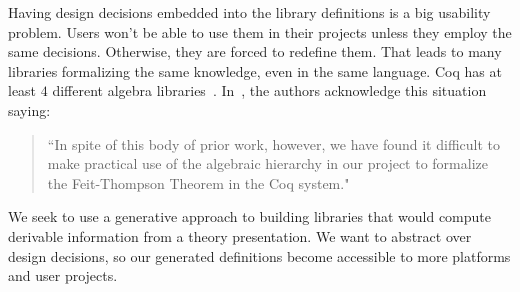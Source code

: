 Having design decisions embedded into the library definitions is a big usability problem. Users won't be able to use them in their projects unless they employ the same decisions. Otherwise, they are forced to redefine them. That leads to many libraries formalizing the same knowledge, even in the same language. Coq has at least $4$ different algebra libraries~\cite{Gonthier2009,Geuvers2002,Spitters2010,coq-contribs-algebra}. In~\cite{Gonthier2009}, the authors acknowledge this situation saying:  
\begin{quote}
    ``In spite of this body of prior work, however, we have found it
    difficult to make practical use of the algebraic hierarchy in our project to
    formalize the Feit-Thompson Theorem in the Coq system."
\end{quote}

We seek to use a generative approach to building libraries that would compute derivable information from a theory presentation. We want to abstract over design decisions, so our generated definitions become accessible to more platforms and user projects.  

